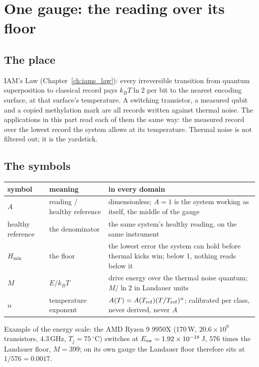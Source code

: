\chapter{One gauge: the reading over its floor}\label{ch:onegauge}

\section*{The place}
IAM's Law (Chapter~\ref{ch:iams_law}): every irreversible transition from quantum superposition to classical record pays $k_BT\ln2$ per bit to
the nearest encoding surface, at that surface's temperature. A switching transistor, a measured qubit and a copied methylation mark are all
records written against thermal noise. The applications in this part read each of them the same way: the measured record over the lowest
record the system allows at its temperature. Thermal noise is not filtered out; it is the yardstick.

\section{The symbols}
\begin{center}\small\begin{tabular}{p{}p{}p{}}\toprule
symbol & meaning & in every domain\\\midrule
$A$ & reading $/$ healthy reference & dimensionless; $A=1$ is the system working as itself, the middle of the gauge\\
healthy reference & the denominator & the same system's healthy reading, on the same instrument\\
$H_{\min}$ & the floor & the lowest error the system can hold before thermal kicks win; below 1, nothing reads below it\\
$M$ & $E/k_BT$ & drive energy over the thermal noise quantum; $M/\ln2$ in Landauer units\\
$n$ & temperature exponent & $A(T)=A(T_{\rm ref})(T/T_{\rm ref})^n$; calibrated per class, never derived, never $A$\\\bottomrule
\end{tabular}\end{center}
Example of the energy scale: the AMD Ryzen 9 9950X (170\,W, $20.6\times10^9$ transistors, 4.3\,GHz, $T_j=75\,^\circ$C) switches at
$E_{\rm sw}=1.92\times10^{-18}$\,J, $576$ times the Landauer floor, $M=399$; on its own gauge the Landauer floor therefore sits at $1/576=0.0017$.

